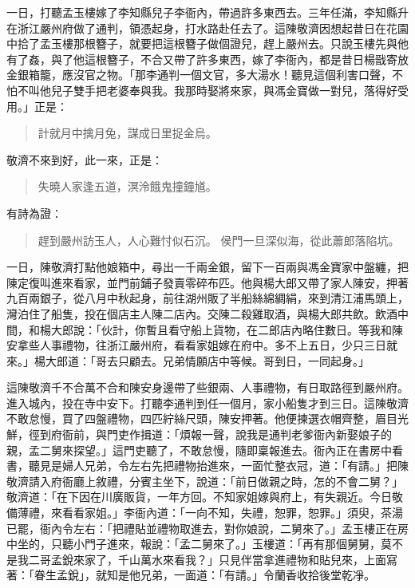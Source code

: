 一日，打聽孟玉樓嫁了李知縣兒子李衙內，帶過許多東西去。三年任滿，李知縣升在浙江嚴州府做了通判，領憑起身，打水路赴任去了。這陳敬濟因想起昔日在花園中拾了孟玉樓那根簪子，就要把這根簪子做個證兒，趕上嚴州去。只說玉樓先與他有了姦，與了他這根簪子，不合又帶了許多東西，嫁了李衙內，都是昔日楊戩寄放金銀箱籠，應沒官之物。「那李通判一個文官，多大湯水！聽見這個利害口聲，不怕不叫他兒子雙手把老婆奉與我。我那時娶將來家，與馮金寶做一對兒，落得好受用。」正是：
\begin{quote}
計就月中擒月兔，謀成日里捉金烏。
\end{quote}
敬濟不來到好，此一來，正是：
\begin{quote}
失曉人家逢五道，溟泠餓鬼撞鐘馗。
\end{quote}
有詩為證：
\begin{quote}
趕到嚴州訪玉人，人心難忖似石沉。
侯門一旦深似海，從此蕭郎落陷坑。
\end{quote}

一日，陳敬濟打點他娘箱中，尋出一千兩金銀，留下一百兩與馮金寶家中盤纏，把陳定復叫進來看家，並門前鋪子發賣零碎布匹。他與楊大郎又帶了家人陳安，押著九百兩銀子，從八月中秋起身，前往湖州販了半船絲綿綢絹，來到清江浦馬頭上，灣泊住了船隻，投在個店主人陳二店內。交陳二殺雞取酒，與楊大郎共飲。飲酒中間，和楊大郎說：「伙計，你暫且看守船上貨物，在二郎店內略住數日。等我和陳安拿些人事禮物，往浙江嚴州府，看看家姐嫁在府中。多不上五日，少只三日就來。」楊大郎道：「哥去只顧去。兄弟情願店中等候。哥到日，一同起身。」

這陳敬濟千不合萬不合和陳安身邊帶了些銀兩、人事禮物，有日取路徑到嚴州府。進入城內，投在寺中安下。打聽李通判到任一個月，家小船隻才到三日。這陳敬濟不敢怠慢，買了四盤禮物，四匹紵絲尺頭，陳安押著。他便揀選衣帽齊整，眉目光鮮，徑到府衙前，與門吏作揖道：「煩報一聲，說我是通判老爹衙內新娶娘子的親，孟二舅來探望。」這門吏聽了，不敢怠慢，隨即稟報進去。衙內正在書房中看書，聽見是婦人兄弟，令左右先把禮物抬進來，一面忙整衣冠，道：「有請。」把陳敬濟請入府衙廳上敘禮，分賓主坐下，說道：「前日做親之時，怎的不會二舅？」敬濟道：「在下因在川廣販貨，一年方回。不知家姐嫁與府上，有失親近。今日敬備薄禮，來看看家姐。」李衙內道：「一向不知，失禮，恕罪，恕罪。」須臾，茶湯已罷，衙內令左右：「把禮貼並禮物取進去，對你娘說，二舅來了。」孟玉樓正在房中坐的，只聽小門子進來，報說：「孟二舅來了。」玉樓道：「再有那個舅舅，莫不是我二哥孟銳來家了，千山萬水來看我？」只見伴當拿進禮物和貼兒來，上面寫著：「眷生孟銳」，就知是他兄弟，一面道：「有請。」令蘭香收拾後堂乾凈。

